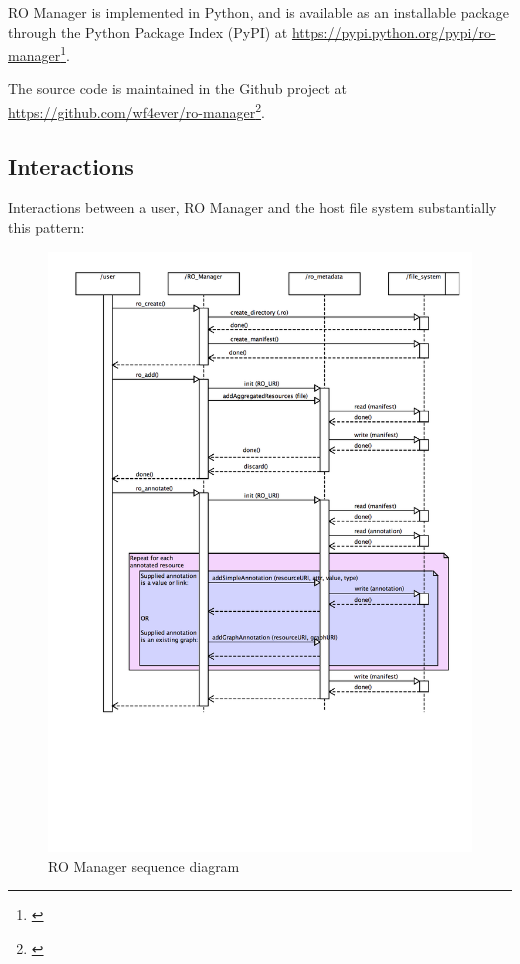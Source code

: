 RO Manager is implemented in Python, and is available as an installable package through the Python Package Index (PyPI) at \href{}{https://pypi.python.org/pypi/ro-manager}\footnote{\href{}{}}.

The source code is maintained in the Github project at \href{}{https://github.com/wf4ever/ro-manager}\footnote{\href{}{}}.

\subsection{Interactions}
\label{interactions}

Interactions between a user, RO Manager and the host file system substantially this pattern:

\begin{figure}
\caption{RO Manager sequence diagram}
\label{romanagersequencediagram}
\begin{center}
\includegraphics{Figures/RO_Manager_seq.png}
\end{center}
\end{figure}


